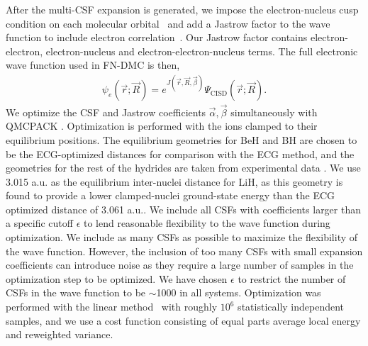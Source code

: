 \documentclass[pra,superscriptaddress,groupedaddress,twocolumn]{revtex4}
\begin{document}
After the multi-CSF expansion is generated, we impose the electron-nucleus cusp condition on each molecular orbital~\cite{cusp} and add a Jastrow factor to the wave function to include electron correlation~\cite{Kato}. Our Jastrow factor contains electron-electron, electron-nucleus and electron-electron-nucleus terms. The full electronic wave function used in FN-DMC is then,
\begin{align}
\psi_e(\vec{r};\vec{R})=e^{J(\vec{r},\vec{R},\vec{\beta})}\Psi_{\text{CISD}}(\vec{r};\vec{R})\label{eq:psie}.
\end{align}
We optimize the CSF and Jastrow coefficients $\vec{\alpha},\vec{\beta}$ simultaneously with QMCPACK \cite{QMCPACK_Kim,QMCPACK_Esler}. Optimization is performed with the ions clamped to their equilibrium positions. The equilibrium geometries for BeH and BH are chosen to be the ECG-optimized distances for comparison with the ECG method, and the geometries for the rest of the hydrides are taken from experimental data \cite{CCCBDB}. We use 3.015 a.u. as the equilibrium inter-nuclei distance for LiH, as this geometry is found to provide a lower clamped-nuclei ground-state energy than the ECG optimized distance of 3.061 a.u.. We include all CSFs with coefficients larger than a specific cutoff $\epsilon$ to lend reasonable flexibility to the wave function during optimization. We include as many CSFs as possible to maximize the flexibility of the wave function. However, the inclusion of too many CSFs with small expansion coefficients can introduce noise as they require a large number of samples in the optimization step to be optimized. We have chosen $\epsilon$ to restrict the number of CSFs in the wave function to be $\sim$1000 in all systems. Optimization was performed with the linear method~\cite{Umrigar_Linear} with roughly $10^6$ statistically independent samples, and we use a cost function consisting of equal parts average local energy and reweighted variance.

%
\end{document}

